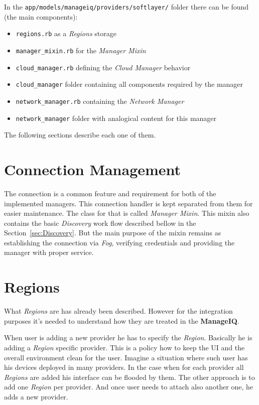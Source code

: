 In the \verb|app/models/manageiq/providers/softlayer/| folder there can be found (the main components):

\begin{itemize}
	\item \verb|regions.rb| as a \emph{Regions} storage
	\item \verb|manager_mixin.rb| for the \emph{Manager Mixin}
	\item \verb|cloud_manager.rb| defining the \emph{Cloud Manager} behavior
	\item \verb|cloud_manager| folder containing all components required by the manager
	\item \verb|network_manager.rb| containing the \emph{Network Manager}
	\item \verb|network_manager| folder with analogical content for this manager
\end{itemize}

The following sections describe each one of them.

\section{Connection Management}
\label{sec:Connection Management}

The connection is a common feature and requirement for both of the implemented managers. This connection handler is kept separated from them for easier maintenance. The class for that is called \emph{Manager Mixin}. This mixin also contains the basic \emph{Discovery} work flow described bellow in the Section~\ref{sec:Discovery}. But the main purpose of the mixin remains as establishing the connection via \emph{Fog}, verifying credentials and providing the manager with proper service.

\section{Regions}
\label{sec:Regions}

What \emph{Regions} are has already been described. However for the integration purposes it's needed to understand how they are treated in the \textbf{ManageIQ}.

When user is adding a new provider he has to specify the \emph{Region}. Basically he is adding a \emph{Region} specific provider. This is a policy how to keep the UI and the overall environment clean for the user. Imagine a situation where such user has his devices deployed in many providers. In the case when for each provider all \emph{Regions} are added his interface can be flooded by them. The other approach is to add one \emph{Region} per provider. And once user needs to attach also another one, he adds a new provider.

